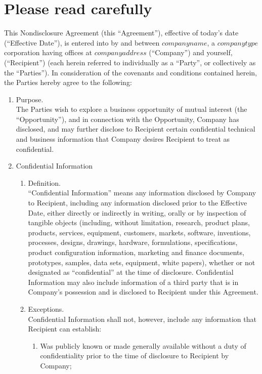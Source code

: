 \documentclass[letterpaper, 12pt]{article}
\begin{document}
\section*{Please read carefully}

This Nondisclosure Agreement (this “Agreement”), effective of today’s date (“Effective Date”), is entered into by and between ${{companyname}}$, a ${{companytype}}$ corporation having offices at ${{companyaddress}}$ (“Company”) and yourself, (“Recipient”) (each herein referred to individually as a “Party”, or collectively as the “Parties”). In consideration of the covenants and conditions contained herein, the Parties hereby agree to the following:

\begin{enumerate}
    \item Purpose.\\
    The Parties wish to explore a business opportunity of mutual interest (the “Opportunity”), and in connection with the Opportunity, Company has disclosed, and may further disclose to Recipient certain confidential technical and business information that Company desires Recipient to treat as confidential.
    \item Confidential Information
    \begin{enumerate}
        \item Definition.\\ “Confidential Information” means any information disclosed by Company to Recipient, including any information disclosed prior to the Effective Date, either directly or indirectly in writing, orally or by inspection of tangible objects (including, without limitation, research, product plans, products, services, equipment, customers, markets, software, inventions, processes, designs, drawings, hardware, formulations, specifications, product configuration information, marketing and finance documents, prototypes, samples, data sets, equipment, white papers), whether or not designated as “confidential” at the time of disclosure. Confidential Information may also include information of a third party that is in Company’s possession and is disclosed to Recipient under this Agreement.
        \item Exceptions.\\
        Confidential Information shall not, however, include any information that Recipient can establish:
        \begin{enumerate}
            \item Was publicly known or made generally available without a duty of confidentiality prior to the time of disclosure to Recipient by Company;

\end{enumerate}
\end{enumerate}
\end{enumerate}
\end{document}

